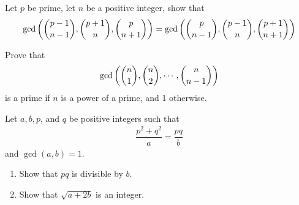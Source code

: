 \begin{problem}
	Let $p$ be prime, let $n$ be a positive integer, show that
		\begin{align*}
			\gcd\left(\binom{p-1}{n-1}, \binom{p+1}{n}, \binom{p}{n+1}\right) = \gcd\left(\binom{p}{n-1}, \binom{p-1}{n}, \binom{p+1}{n+1}\right)
		\end{align*}
\end{problem}




\begin{problem}
	Prove that
		\begin{align*}
			\gcd{\left(\binom{n}{1},\binom{n}{2},\cdots,\binom{n}{n-1}\right)}
		\end{align*}
	is a prime if $n$ is a power of a prime, and 1 otherwise. %
\end{problem}

%

\begin{problem}
	Let $a,b,p$, and $q$ be positive integers such that
		\begin{align*}
			\dfrac {p^{2} + q^{2}}{a} = \dfrac {pq}{b}
		\end{align*}
	and $\gcd(a, b) = 1.$
	\begin{enumerate}
		\item  Show that $pq$ is divisible by $b$.

		\item Show that $\sqrt {a + 2b}$ is an integer.
	\end{enumerate} %
\end{problem}

